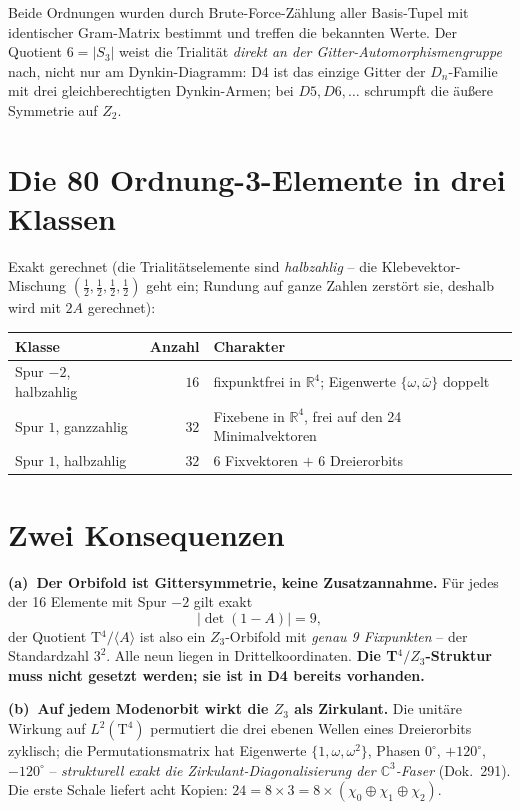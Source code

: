 Beide Ordnungen wurden durch Brute-Force-Zählung aller
Basis-Tupel mit identischer Gram-Matrix bestimmt und treffen die
bekannten Werte. Der Quotient $6 = |S_3|$ weist die Trialität
\emph{direkt an der Gitter-Automorphismengruppe} nach, nicht nur am
Dynkin-Diagramm: D4 ist das einzige Gitter der $D_n$-Familie mit
drei gleichberechtigten Dynkin-Armen; bei $D5, D6, \dots$ schrumpft
die äußere Symmetrie auf $Z_2$.

\section{Die 80 Ordnung-3-Elemente in drei Klassen}

Exakt gerechnet (die Trialitätselemente sind \emph{halbzahlig} --
die Klebevektor-Mischung $(\frac12,\frac12,\frac12,\frac12)$ geht
ein; Rundung auf ganze Zahlen zerstört sie, deshalb wird mit $2A$
gerechnet):

\begin{center}
\begin{tabular}{lrl}
\toprule
Klasse & Anzahl & Charakter \\
\midrule
Spur $-2$, halbzahlig & $16$ & fixpunktfrei in $\mathbb{R}^4$;
  Eigenwerte $\{\omega,\bar\omega\}$ doppelt \\
Spur $1$, ganzzahlig & $32$ & Fixebene in $\mathbb{R}^4$,
  frei auf den 24 Minimalvektoren \\
Spur $1$, halbzahlig & $32$ & 6 Fixvektoren $+$ 6 Dreierorbits \\
\bottomrule
\end{tabular}
\end{center}

\section{Zwei Konsequenzen}

\textbf{(a)~Der Orbifold ist Gittersymmetrie, keine Zusatzannahme.}
Für jedes der 16 Elemente mit Spur $-2$ gilt exakt
\begin{equation}
  |\det(1-A)| = 9,
\end{equation}
der Quotient T$^4/\langle A\rangle$ ist also ein $Z_3$-Orbifold mit
\emph{genau 9 Fixpunkten} -- der Standardzahl $3^2$. Alle neun
liegen in Drittelkoordinaten. \textbf{Die T$^4/Z_3$-Struktur muss
nicht gesetzt werden; sie ist in D4 bereits vorhanden.}

\textbf{(b)~Auf jedem Modenorbit wirkt die $Z_3$ als Zirkulant.} Die
unitäre Wirkung auf $L^2(\text{T}^4)$ permutiert die drei ebenen
Wellen eines Dreierorbits zyklisch; die Permutationsmatrix hat
Eigenwerte $\{1,\omega,\omega^2\}$, Phasen $0^\circ$, $+120^\circ$,
$-120^\circ$ -- \emph{strukturell exakt die
Zirkulant-Diagonalisierung der $\mathbb{C}^3$-Faser} (Dok.~291). Die
erste Schale liefert acht Kopien: $24 = 8\times3
= 8\times(\chi_0\oplus\chi_1\oplus\chi_2)$.

